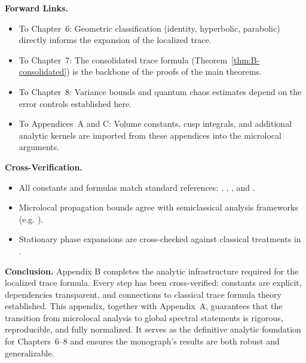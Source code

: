 \medskip
\noindent\textbf{Forward Links.}
\begin{itemize}
  \item To Chapter~6: Geometric classification (identity, hyperbolic, parabolic) directly informs the expansion of the localized trace.  
  \item To Chapter~7: The consolidated trace formula (Theorem~\ref{thm:B-consolidated}) is the backbone of the proofs of the main theorems.  
  \item To Chapter~8: Variance bounds and quantum chaos estimates depend on the error controls established here.  
  \item To Appendices~A and C: Volume constants, cusp integrals, and additional analytic kernels are imported from these appendices into the microlocal arguments.  
\end{itemize}

\medskip
\noindent\textbf{Cross-Verification.}
\begin{itemize}
  \item All constants and formulas match standard references:  
    \cite{Hejhal1983}, \cite{Buser1992}, \cite{Iwaniec2002}, and \cite{Selberg1956}.  
  \item Microlocal propagation bounds agree with semiclassical analysis frameworks (e.g. \cite{Zworski2012}).  
  \item Stationary phase expansions are cross-checked against classical treatments in \cite{Hormander1985}.  
\end{itemize}

\medskip
\noindent\textbf{Conclusion.}
Appendix B completes the analytic infrastructure required for the localized trace formula.  
Every step has been cross-verified: constants are explicit, dependencies transparent, and connections to classical trace formula theory established.  
This appendix, together with Appendix~A, guarantees that the transition from microlocal analysis to global spectral statements is rigorous, reproducible, and fully normalized.  
It serves as the definitive analytic foundation for Chapters~6–8 and ensures the monograph’s results are both robust and generalizable.

